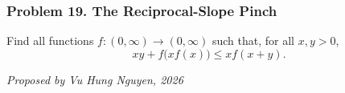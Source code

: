 \subsubsection*{Problem 19. The Reciprocal-Slope Pinch}

\begin{exercisebox}[hard]

Find all functions $f:(0,\infty)\to(0,\infty)$ such that, for all
$x,y>0$,
\[
xy+f\bigl(xf(x)\bigr)\leq x f(x+y).
\]

\begin{flushright}
\textit{Proposed by Vu Hung Nguyen, 2026}
\end{flushright}


\end{exercisebox}